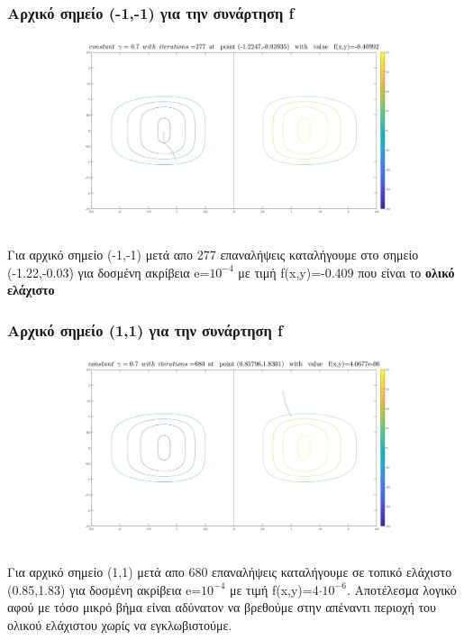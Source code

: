 \documentclass{article}
\begin{document}
\subsubsection*{Αρχικό σημείο (-1,-1) για την συνάρτηση f}
\begin{figure}[h!]	
     \centering  
     \advance\leftskip-0.2cm  
  \includegraphics[width=140mm,scale=2]{t1b.jpg}
\end{figure} 
Για αρχικό σημείο (-1,-1) μετά απο 277 επαναλήψεις καταλήγουμε στο σημείο (-1.22,-0.03) για  δοσμένη ακρίβεια e=$10^{-4}$ με τιμή f(x,y)=-0.409 που είναι  το \textbf{ολικό ελάχιστο}
\clearpage
\subsubsection*{Αρχικό σημείο (1,1) για την συνάρτηση f}
\begin{figure}[h!]	
     \centering  
     \advance\leftskip-0.2cm  
  \includegraphics[width=130mm,scale=2]{t1c.jpg}
\end{figure} 
Για αρχικό σημείο (1,1) μετά απο 680 επαναλήψεις καταλήγουμε σε τοπικό ελάχιστο (0.85,1.83) για δοσμένη ακρίβεια e=$10^{-4}$ με τιμή f(x,y)=4$\cdot 10^{-6}$. Αποτέλεσμα λογικό αφού με τόσο μικρό βήμα είναι αδύνατον να βρεθούμε στην απέναντι περιοχή του ολικού ελάχιστου χωρίς να εγκλωβιστούμε.
\end{document}
